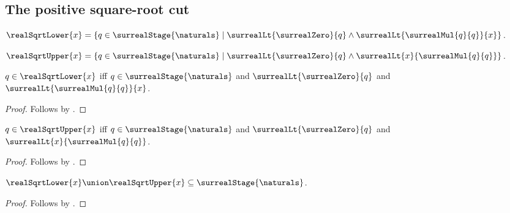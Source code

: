 \subsection{The positive square-root cut}

\begin{definition}\label{surreal_real_sqrt_lower}
    $\realSqrtLower{x}=
        \{q\in\surrealStage{\naturals}\mid
            \surrealLt{\surrealZero}{q}\land
            \surrealLt{\surrealMul{q}{q}}{x}\}$.
\end{definition}

\begin{definition}\label{surreal_real_sqrt_upper}
    $\realSqrtUpper{x}=
        \{q\in\surrealStage{\naturals}\mid
            \surrealLt{\surrealZero}{q}\land
            \surrealLt{x}{\surrealMul{q}{q}}\}$.
\end{definition}

\begin{proposition}\label{surreal_real_sqrt_lower_iff}
    $q\in\realSqrtLower{x}$ iff
        $q\in\surrealStage{\naturals}$ and
        $\surrealLt{\surrealZero}{q}$ and
        $\surrealLt{\surrealMul{q}{q}}{x}$.
\end{proposition}
\begin{proof}
    Follows by .
\end{proof}

\begin{proposition}\label{surreal_real_sqrt_upper_iff}
    $q\in\realSqrtUpper{x}$ iff
        $q\in\surrealStage{\naturals}$ and
        $\surrealLt{\surrealZero}{q}$ and
        $\surrealLt{x}{\surrealMul{q}{q}}$.
\end{proposition}
\begin{proof}
    Follows by .
\end{proof}

\begin{proposition}\label{surreal_real_sqrt_bounds_finite_stage}
    $\realSqrtLower{x}\union\realSqrtUpper{x}
        \subseteq\surrealStage{\naturals}$.
\end{proposition}
\begin{proof}
    Follows by
        .
\end{proof}

